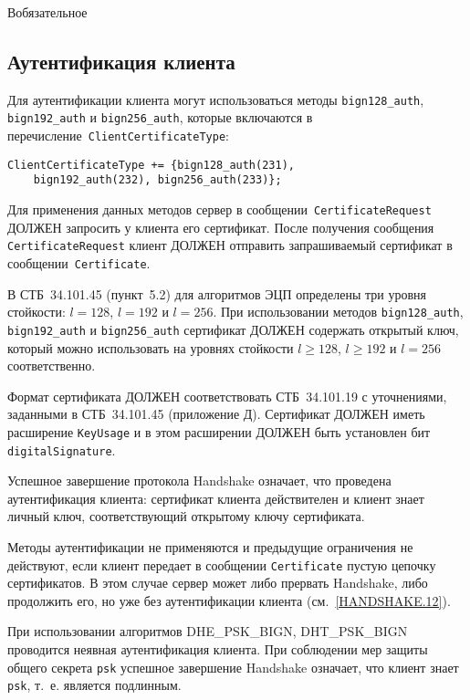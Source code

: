 \begin{appendix}{В}{обязательное}
\subsection{Аутентификация клиента}\label{BSUITES.3.2}

Для аутентификации клиента могут использоваться методы
\mbox{\lstinline{bign128_auth},} \lstinline{bign192_auth} и
\lstinline{bign256_auth}, которые включаются в 
перечисление~\lstinline{ClientCertificateType}: 
\begin{lstlisting}
ClientCertificateType += {bign128_auth(231),
    bign192_auth(232), bign256_auth(233)};
\end{lstlisting}

Для применения данных методов сервер в сообщении~\lstinline{CertificateRequest} 
ДОЛЖЕН запросить у клиента его сертификат. После получения сообщения 
\lstinline{CertificateRequest} клиент ДОЛЖЕН отправить запрашиваемый сертификат 
в сообщении~\lstinline{Certificate}.  

В СТБ~34.101.45 (пункт~5.2) для алгоритмов ЭЦП определены три уровня 
стойкости: $l = 128$, $l = 192$ и $l = 256$. При использовании методов 
\lstinline{bign128_auth}, \lstinline{bign192_auth} и 
\lstinline{bign256_auth} сертификат ДОЛЖЕН содержать открытый ключ, 
который можно использовать на уровнях стойкости $l \geq 128$,  
$l\geq 192$ и $l = 256$ соответственно.  

Формат сертификата ДОЛЖЕН соответствовать СТБ~34.101.19 с уточнениями, 
заданными в СТБ~34.101.45 (приложение Д). Сертификат ДОЛЖЕН иметь 
расширение \lstinline{KeyUsage} и в этом расширении ДОЛЖЕН быть установлен бит 
\lstinline{digitalSignature}. 

Успешное завершение протокола Handshake означает, что проведена 
аутентификация клиента: сертификат клиента действителен и клиент знает 
личный ключ, соответствующий открытому ключу сертификата. 

Методы аутентификации не применяются и предыдущие ограничения не 
действуют, если клиент передает в сообщении \lstinline{Certificate} пустую цепочку 
сертификатов. В этом случае сервер может либо прервать Handshake, либо 
продолжить его, но уже без аутентификации клиента (см.~\ref{HANDSHAKE.12}). 

При использовании алгоритмов DHE\_PSK\_BIGN, DHT\_PSK\_BIGN проводится неявная 
аутентификация клиента. При соблюдении мер защиты общего секрета \lstinline{psk} 
успешное завершение Handshake означает, что клиент знает \lstinline{psk}, 
т.~е. является подлинным. 


\end{appendix}
